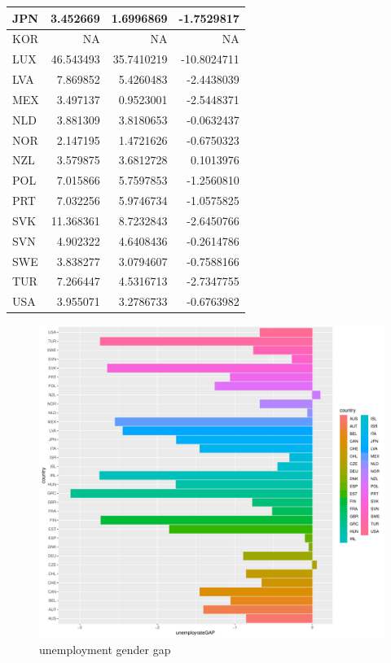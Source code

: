 \documentclass[11pt,a4paper,]{article}
\begin{document}
\begin{table}
\begin{tabular}[t]{l|r|r|r}
JPN & 3.452669 & 1.6996869 & -1.7529817\\
\hline
KOR & NA & NA & NA\\
\hline
LUX & 46.543493 & 35.7410219 & -10.8024711\\
\hline
LVA & 7.869852 & 5.4260483 & -2.4438039\\
\hline
MEX & 3.497137 & 0.9523001 & -2.5448371\\
\hline
NLD & 3.881309 & 3.8180653 & -0.0632437\\
\hline
NOR & 2.147195 & 1.4721626 & -0.6750323\\
\hline
NZL & 3.579875 & 3.6812728 & 0.1013976\\
\hline
POL & 7.015866 & 5.7597853 & -1.2560810\\
\hline
PRT & 7.032256 & 5.9746734 & -1.0575825\\
\hline
SVK & 11.368361 & 8.7232843 & -2.6450766\\
\hline
SVN & 4.902322 & 4.6408436 & -0.2614786\\
\hline
SWE & 3.838277 & 3.0794607 & -0.7588166\\
\hline
TUR & 7.266447 & 4.5316713 & -2.7347755\\
\hline
USA & 3.955071 & 3.2786733 & -0.6763982\\
\hline
\end{tabular}
\end{table}

\newpage

\begin{figure}
\centering
\includegraphics{ETC5513assignment4_files/figure-latex/GAP-1.pdf}
\caption{\label{fig:GAP}unemployment gender gap}
\end{figure}
\end{document}
